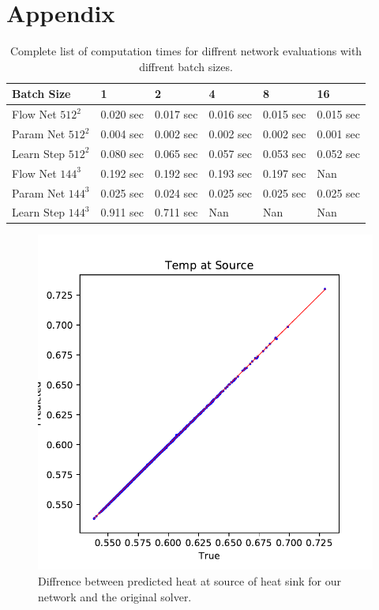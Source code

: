 \documentclass{article} %
\begin{document}



\section{Appendix}

\begin{table}[t]
\caption{Complete list of computation times for diffrent network evaluations with diffrent batch sizes.}
\label{computation_table}
\begin{center}
\begin{tabular}{l|lllll}
Batch Size & 1 & 2 & 4 & 8 & 16 \\ \hline 
Flow Net $512^2$ & 0.020 sec & 0.017 sec & 0.016 sec & 0.015 sec & 0.015 sec \\ 
Param Net $512^2$ & 0.004 sec & 0.002 sec & 0.002 sec & 0.002 sec & 0.001 sec \\ 
Learn Step $512^2$ & 0.080 sec & 0.065 sec & 0.057 sec & 0.053 sec & 0.052 sec \\ 
Flow Net $144^3$ & 0.192 sec & 0.192 sec & 0.193 sec & 0.197 sec & Nan \\ 
Param Net $144^3$ & 0.025 sec & 0.024 sec & 0.025 sec & 0.025 sec & 0.025 sec \\ 
Learn Step $144^3$ & 0.911 sec & 0.711 sec & Nan & Nan & Nan \\ 
\end{tabular}
\end{center}
\end{table}

\begin{figure}[h]
\begin{center}
\includegraphics[scale=0.40]{../test/figs/heat_accuracy.pdf}
\end{center}
\caption{Diffrence between predicted heat at source of heat sink for our network and the original solver.}
\end{figure}
\end{document}
